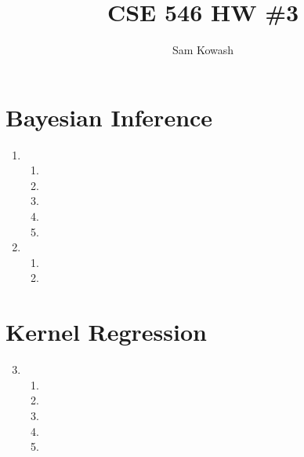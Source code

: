\documentclass[11pt,letterpaper]{article}
\author{Sam Kowash}
\title{CSE 546 HW \#3}
\theoremstyle{definition}
\theoremstyle{plain}
\numberwithin{equation}{section}
\numberwithin{figure}{section}
\begin{document}
\maketitle

\section{Bayesian Inference}
\begin{enumerate}
	\item \begin{enumerate}
		\item
		\item 
		\item 
		\item 
		\item 
	\end{enumerate}






	\item \begin{enumerate}
		\item
		\item 
	\end{enumerate}
\end{enumerate}
































\section{Kernel Regression}
\begin{enumerate}
\setcounter{enumi}{2}
	\item \begin{enumerate}
		\item
		\item 
		\item 
		\item 
		\item 
	\end{enumerate}
\end{enumerate}
\end{document}
